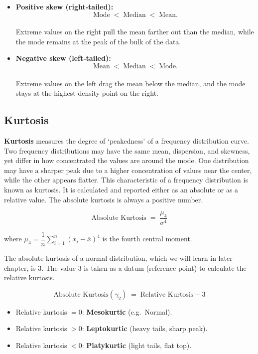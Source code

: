 \documentclass[twoside]{book}
\begin{document}
\begin{itemize}
  \item \textbf{Positive skew (right‐tailed):}
    \[
      \text{Mode} \;<\; \text{Median} \;<\; \text{Mean}.
    \]
    \\
    Extreme values on the right pull the mean farther out than the median, while the mode remains at the peak of the bulk of the data.
  
  \item \textbf{Negative skew (left‐tailed):}
    \[
      \text{Mean} \;<\; \text{Median} \;<\; \text{Mode}.
    \]
    \\
    Extreme values on the left drag the mean below the median, and the mode stays at the highest‐density point on the right.
\end{itemize}

\subsection{Kurtosis}

\textbf{Kurtosis} measures the degree of `peakedness' of a frequency distribution curve. Two frequency distributions may have the same mean, dispersion, and skewness, yet differ in how concentrated the values are around the mode. One distribution may have a sharper peak due to a higher concentration of values near the center, while the other appears flatter. This characteristic of a frequency distribution is known as kurtosis. It is calculated and reported either as an absolute or as a relative value. The absolute kurtosis is always a positive number.

\begin{textbox}
\[
\text{Absolute Kurtosis} \;=\;\frac{\mu_4}{\sigma^4}
\]
\end{textbox}
where \(\mu_4 = \dfrac{1}{n} \sum_{i=1}^n (x_i - \overline{x})^4\) is the fourth central moment.

The absolute kurtosis of a normal distribution, which we will learn in later chapter, is 3. The value 3 is taken as a datum (reference point) to calculate the relative kurtosis.
\begin{textbox}
\[
\text{Absolute Kurtosis}(\gamma_2) \;=\;\text{Relative Kurtosis} - 3
\]
\end{textbox}

\begin{itemize}
  \item Relative kurtosis \(=0\): \textbf{Mesokurtic} (e.g.\ Normal).
  \item Relative kurtosis \(>0\): \textbf{Leptokurtic} (heavy tails, sharp peak).
  \item Relative kurtosis \(<0\): \textbf{Platykurtic} (light tails, flat top).
\end{itemize}
\end{document}
